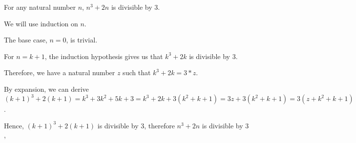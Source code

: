 For any natural number $n$, $n^3 + 2n$ is divisible by $3$.

We will use induction on $n$.

The base case, $n = 0$, is trivial.

For $n = k+1$, the induction hypothesis gives us that $k^3 + 2k$ is divisible by $3$.

Therefore, we have a natural number $z$ such that $k^3 + 2k = 3*z$.

By expansion, we can derive $(k+1)^3 + 2(k+1) = k^3 + 3k^2 + 5k + 3 = k^3 + 2k + 3(k^2 + k + 1) =3z + 3(k^2 + k + 1) = 3(z+k^2+k+1)$.

Hence, $(k+1)^3 + 2(k+1)$ is divisible by $3$, therefore $n^3 + 2n$ is divisible by $3$,
